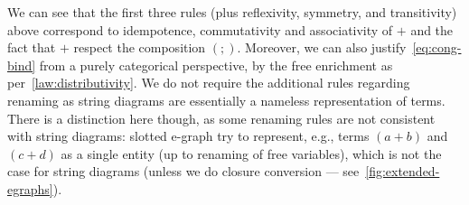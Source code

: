 	We can see that the first three rules (plus reflexivity, symmetry, and transitivity) above correspond to idempotence, commutativity and associativity of $+$ and the fact that $+$ respect the composition $(;)$.
	Moreover, we can also justify~\autoref{eq:cong-bind} from a purely categorical perspective, by the free enrichment as per~\autoref{law:distributivity}.
	We do not require the additional rules regarding renaming as string diagrams are essentially a nameless representation of terms.
	There is a distinction here though, as some renaming rules are not consistent with string diagrams: slotted e-graph try to represent, e.g., terms $(a + b)$ and $(c + d)$ as a single entity (up to renaming of free variables), which is not the case for string diagrams (unless we do closure conversion --- see~\autoref{fig:extended-egraphs}).


